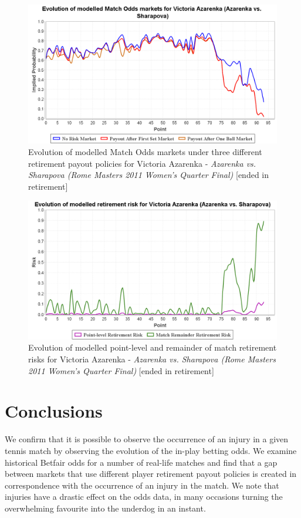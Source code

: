 \documentclass[authoryear, 12pt]{elsarticle}
\begin{document}
\begin{figure}[H]
  \centering \includegraphics[width=12.3cm]{azarenkasharapovamodel}
  \caption{Evolution of modelled Match Odds markets under three different retirement payout policies for Victoria Azarenka - \textit{Azarenka vs. Sharapova (Rome Masters 2011 Women's Quarter Final)} [ended in retirement]}
  \label{azarenkasharapovamodel}
\end{figure}

\begin{figure}[H]
  \centering \includegraphics[width=12.3cm]{azarenkasharapovarisk}
  \caption{Evolution of modelled point-level and remainder of match retirement risks for Victoria Azarenka - \textit{Azarenka vs. Sharapova (Rome Masters 2011 Women's Quarter Final)} [ended in retirement]}
  \label{azarenkasharapovarisk}
\end{figure}

\section{Conclusions}

We confirm that it is possible to observe the occurrence of an injury in a given tennis match by observing the evolution of the in-play betting odds.  We examine historical Betfair odds for a number of real-life matches and find that a gap between markets that use different player retirement payout policies is created in correspondence with the occurrence of an injury in the match.  We note that injuries have a drastic effect on the odds data, in many occasions turning the overwhelming favourite into the underdog in an instant.
\end{document}
